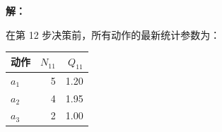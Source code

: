 \documentclass[a4paper]{article}
\newenvironment{solution}{\par\noindent\textbf{解：}\par}{\par}
\begin{document}
\begin{enumerate}
\begin{solution}
\begin{enumerate}[label=(\arabic*)]
在第 12 步决策前，所有动作的最新统计参数为：
\begin{center}
\begin{tabular}{lrr}
\toprule
动作 & $N_{11}$ & $Q_{11}$ \\
\midrule
$a_1$ & 5 & 1.20 \\
$a_2$ & 4 & 1.95 \\
$a_3$ & 2 & 1.00 \\
\bottomrule
\end{tabular}
\end{center}
\end{enumerate}
\end{solution}

\end{enumerate}
\end{document}
